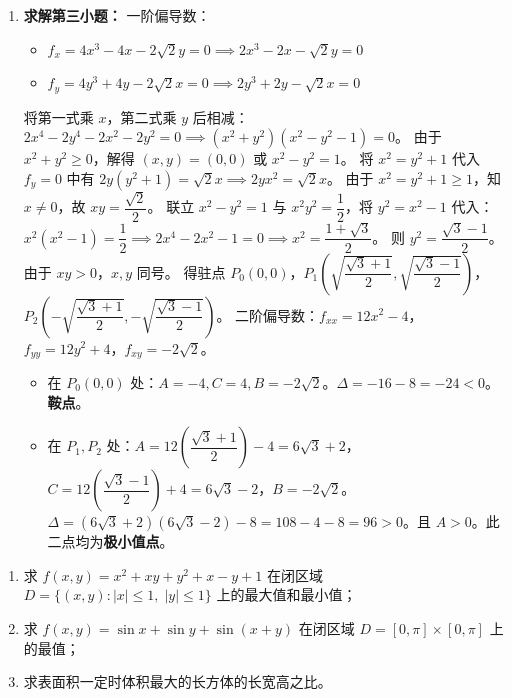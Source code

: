 \documentclass[lang=cn,11pt]{elegantbook}
\begin{document}
\begin{solution}
\begin{enumerate}
  \item[(3)] \textbf{求解第三小题：}
  一阶偏导数：
  \begin{itemize}
    \item $f_x = 4x^3 - 4x - 2\sqrt{2}y = 0 \implies 2x^3 - 2x - \sqrt{2}y = 0$
    \item $f_y = 4y^3 + 4y - 2\sqrt{2}x = 0 \implies 2y^3 + 2y - \sqrt{2}x = 0$
  \end{itemize}
  将第一式乘 $x$，第二式乘 $y$ 后相减：$2x^4 - 2y^4 - 2x^2 - 2y^2 = 0 \implies (x^2+y^2)(x^2-y^2-1) = 0$。
  由于 $x^2+y^2 \geq 0$，解得 $(x,y)=(0,0)$ 或 $x^2-y^2=1$。
  将 $x^2 = y^2+1$ 代入 $f_y=0$ 中有 $2y(y^2+1) = \sqrt{2}x \implies 2yx^2 = \sqrt{2}x$。
  由于 $x^2 = y^2+1 \geq 1$，知 $x \neq 0$，故 $xy = \dfrac{\sqrt{2}}{2}$。
  联立 $x^2-y^2=1$ 与 $x^2y^2=\dfrac{1}{2}$，将 $y^2 = x^2-1$ 代入：$x^2(x^2-1) = \dfrac{1}{2} \implies 2x^4 - 2x^2 - 1 = 0 \implies x^2 = \dfrac{1+\sqrt{3}}{2}$。
  则 $y^2 = \dfrac{\sqrt{3}-1}{2}$。由于 $xy > 0$，$x,y$ 同号。
  得驻点 $P_0(0,0)$，$P_1\left(\sqrt{\dfrac{\sqrt{3}+1}{2}}, \sqrt{\dfrac{\sqrt{3}-1}{2}}\right)$，$P_2\left(-\sqrt{\dfrac{\sqrt{3}+1}{2}}, -\sqrt{\dfrac{\sqrt{3}-1}{2}}\right)$。
  二阶偏导数：$f_{xx} = 12x^2-4$，$f_{yy} = 12y^2+4$，$f_{xy} = -2\sqrt{2}$。
  \begin{itemize}
    \item 在 $P_0(0,0)$ 处：$A=-4, C=4, B=-2\sqrt{2}$。$\Delta = -16 - 8 = -24 < 0$。\textbf{鞍点}。
    \item 在 $P_1, P_2$ 处：$A = 12\left(\dfrac{\sqrt{3}+1}{2}\right)-4 = 6\sqrt{3}+2$，$C = 12\left(\dfrac{\sqrt{3}-1}{2}\right)+4 = 6\sqrt{3}-2$，$B = -2\sqrt{2}$。
          $\Delta = (6\sqrt{3}+2)(6\sqrt{3}-2) - 8 = 108 - 4 - 8 = 96 > 0$。且 $A > 0$。此二点均为\textbf{极小值点}。
  \end{itemize}
\end{enumerate}
\end{solution}

\begin{exercise}[提高：闭域上的最值]
\begin{enumerate}
  \item[(1)] 求 $f(x,y)=x^2+xy+y^2+x-y+1$ 在闭区域 $D=\{(x,y):|x|\leq 1,\;|y|\leq 1\}$ 上的最大值和最小值；
  \item[(2)] 求 $f(x,y)=\sin x+\sin y+\sin(x+y)$ 在闭区域 $D=[0,\pi]\times[0,\pi]$ 上的最值；
  \item[(3)] 求表面积一定时体积最大的长方体的长宽高之比。
\end{enumerate}
\end{exercise}
\end{document}
